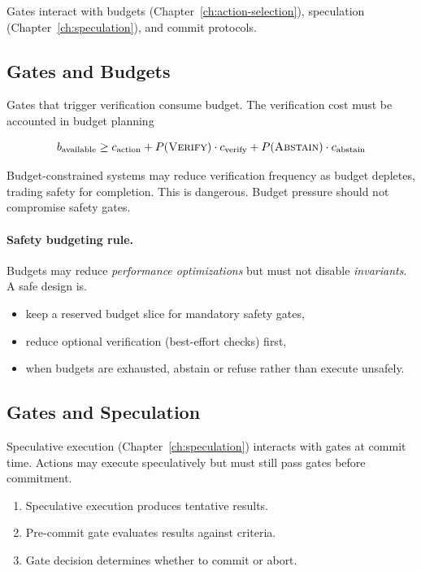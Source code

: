 Gates interact with budgets (Chapter~\ref{ch:action-selection}), speculation (Chapter~\ref{ch:speculation}), and commit protocols.

\subsection{Gates and Budgets}

Gates that trigger verification consume budget. The verification cost must be accounted in budget planning

\[
b_{\text{available}} \geq c_{\text{action}} + P(\textsc{Verify}) \cdot c_{\text{verify}} + P(\textsc{Abstain}) \cdot c_{\text{abstain}}
\]

Budget-constrained systems may reduce verification frequency as budget depletes, trading safety for completion. This is dangerous. Budget pressure should not compromise safety gates.

\paragraph{Safety budgeting rule.}
Budgets may reduce \emph{performance optimizations} but must not disable \emph{invariants}. A safe design is.
\begin{itemize}
\item keep a reserved budget slice for mandatory safety gates,
\item reduce optional verification (best-effort checks) first,
\item when budgets are exhausted, abstain or refuse rather than execute unsafely.
\end{itemize}

\subsection{Gates and Speculation}

Speculative execution (Chapter~\ref{ch:speculation}) interacts with gates at commit time. Actions may execute speculatively but must still pass gates before commitment.

\begin{enumerate}
\item Speculative execution produces tentative results.
\item Pre-commit gate evaluates results against criteria.
\item Gate decision determines whether to commit or abort.
\end{enumerate}

